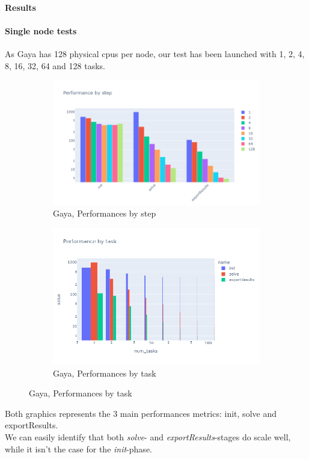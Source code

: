 \documentclass[10pt]{beamer}
\begin{document}
\begin{frame}{\textbf{Results}}
    \framesubtitle{\textbf{Single node tests}}
    As Gaya has 128 physical cpus per node, our test has been launched with 1, 2, 4, 8, 16, 32, 64 and 128 tasks.

    \begin{figure}[h]
        \centering
        \begin{subfigure}{0.45\textwidth}
          \centering
          \includegraphics[width=\textwidth]{../illustrations/gaya-graphs/gayaByStep.png}
          \caption{Gaya, Performances by step}
        \end{subfigure}
        \begin{subfigure}{0.45\textwidth}
          \centering
          \includegraphics[width=\textwidth]{../illustrations/gaya-graphs/gayaByTask.png}
          \caption{Gaya, Performances by task}
        \end{subfigure}
      \end{figure}

      Both graphics represents the 3 main performances metrics: init, solve and exportResults. \\
      We can easily identify that both \textit{solve}- and \textit{exportResults}-stages do scale well, while it isn't the case for the \textit{init}-phase.
\end{frame}
\end{document}
